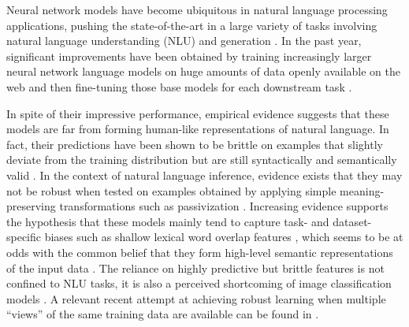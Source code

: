 
Neural network models have become ubiquitous in natural language processing applications, pushing the state-of-the-art in a large variety of tasks involving natural language understanding (NLU) and generation \cite{wu2016google,wang2019superglue}.
In the past year, significant improvements have been obtained by  training increasingly larger neural network language models on huge amounts of data openly available on the web and then fine-tuning those base models for each downstream task \cite{devlin2018bert,peters2018deep,liu2019multi}.

In spite of their impressive performance, empirical evidence suggests that these models are far from forming human-like representations of natural language. In fact, their predictions have been shown to be brittle on examples that slightly deviate from the training distribution but are still syntactically and semantically valid \cite{jia2017adversarial,linzen2019right}. In the context of natural language inference, evidence exists that they may not be robust when tested on examples obtained by applying simple meaning-preserving transformations such as passivization \cite{dasgupta2018evaluating}.
Increasing evidence supports the hypothesis that these models mainly tend to capture task- and dataset-specific biases such as shallow lexical word overlap features \cite{poliak2018hypothesis,dasgupta2018evaluating,linzen2019right,clark2019dont,zhang-etal-2019-paws}, which seems to be at odds with the common belief that they form high-level semantic representations of the input data \cite{bengio2009learning}. The reliance on highly predictive but brittle features is not confined to NLU tasks, it is also a perceived shortcoming of image classification models \cite{brendel2019approximating,geirhos2018imagenet,jacobsen2018excessive}. A relevant recent attempt at achieving robust learning when multiple ``views'' of the same training data are available can be found in .

